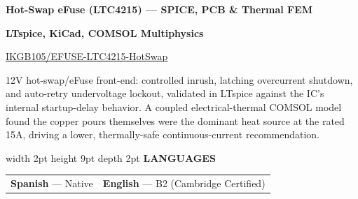 \documentclass[10pt]{extarticle}
\newcommand{\cvsection}[1]{%
  \vspace{4pt}
  {\color{accent}\vrule width 2pt height 9pt depth 2pt}\hspace{5pt}%
  {\color{primary}\bfseries\fontsize{10.5}{10.5}\selectfont\MakeUppercase{#1}}%
  \vspace{4pt}\par\vspace{2pt}
}
\newcommand{\projtitle}[1]{{\color{primary}\bfseries\fontsize{10.5}{12}\selectfont #1}\par}
\newcommand{\projtech}[1]{{\color{accent}\bfseries\fontsize{9.5}{11}\selectfont #1}\par}
\newcommand{\projlink}[2]{{\color{secondary}\fontsize{9.5}{11}\selectfont \href{#1}{#2}}\par}
\newcommand{\projdesc}[1]{{\fontsize{9.5}{12}\selectfont #1}\par}
\begin{document}
\projtitle{Hot-Swap eFuse (LTC4215) --- SPICE, PCB \& Thermal FEM}
\projtech{LTspice, KiCad, COMSOL Multiphysics}
\projlink{https://github.com/IKGB105/EFUSE-LTC4215-HotSwap}{IKGB105/EFUSE-LTC4215-HotSwap}
\projdesc{12V hot-swap/eFuse front-end: controlled inrush, latching overcurrent shutdown, and auto-retry undervoltage lockout, validated in LTspice against the IC's internal startup-delay behavior. A coupled electrical-thermal COMSOL model found the copper pours themselves were the dominant heat source at the rated 15A, driving a lower, thermally-safe continuous-current recommendation.}

\cvsection{Languages}
\begin{tabularx}{\textwidth}{@{}X X@{}}
{\color{primary}\bfseries\fontsize{9.5}{9.5}\selectfont Spanish} {\color{textlight}\fontsize{9}{9}\selectfont --- Native} &
{\color{primary}\bfseries\fontsize{9.5}{9.5}\selectfont English} {\color{textlight}\fontsize{9}{9}\selectfont --- B2 (Cambridge Certified)}
\end{tabularx}
\end{document}
